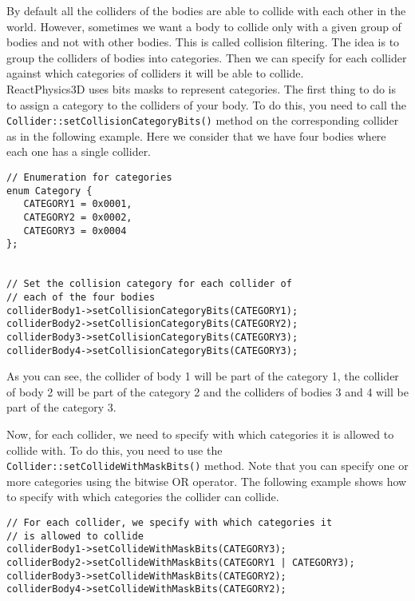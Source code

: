 \documentclass[a4paper,12pt]{article}
\begin{document}
    By default all the colliders of the bodies are able to collide with each other in the world. However, sometimes we want a body to collide only
    with a given group of bodies and not with other bodies. This is called collision filtering. The idea is to group the colliders of bodies into
    categories. Then we can specify for each collider against which categories of colliders it will be able to collide. \\

    ReactPhysics3D uses bits masks to represent categories. The first thing to do is to assign a category to the colliders of your body. To do
    this, you need to call the \texttt{Collider::setCollisionCategoryBits()} method on the corresponding collider as in the following example. Here
    we consider that we have four bodies where each one has a single collider. \\

    \begin{lstlisting}
// Enumeration for categories
enum Category {
   CATEGORY1 = 0x0001,
   CATEGORY2 = 0x0002,
   CATEGORY3 = 0x0004
};


// Set the collision category for each collider of
// each of the four bodies
colliderBody1->setCollisionCategoryBits(CATEGORY1);
colliderBody2->setCollisionCategoryBits(CATEGORY2);
colliderBody3->setCollisionCategoryBits(CATEGORY3);
colliderBody4->setCollisionCategoryBits(CATEGORY3);
  \end{lstlisting}

    \vspace{0.6cm}

    As you can see, the collider of body 1 will be part of the category 1, the collider of body 2 will be part of the category 2 and the colliders of
    bodies 3 and 4 will be part of the category 3. \\

    \begin{sloppypar}
    Now, for each collider, we need to specify with which categories it is allowed to collide with. To do this, you need to use the 
    \texttt{Collider::setCollideWithMaskBits()} method. Note that you can specify one or more categories using the bitwise OR operator. The
    following example shows how to specify with which categories the collider can collide. \\
    \end{sloppypar}

    \begin{lstlisting}
// For each collider, we specify with which categories it
// is allowed to collide
colliderBody1->setCollideWithMaskBits(CATEGORY3);
colliderBody2->setCollideWithMaskBits(CATEGORY1 | CATEGORY3);
colliderBody3->setCollideWithMaskBits(CATEGORY2);
colliderBody4->setCollideWithMaskBits(CATEGORY2);
  \end{lstlisting}
\end{document}
